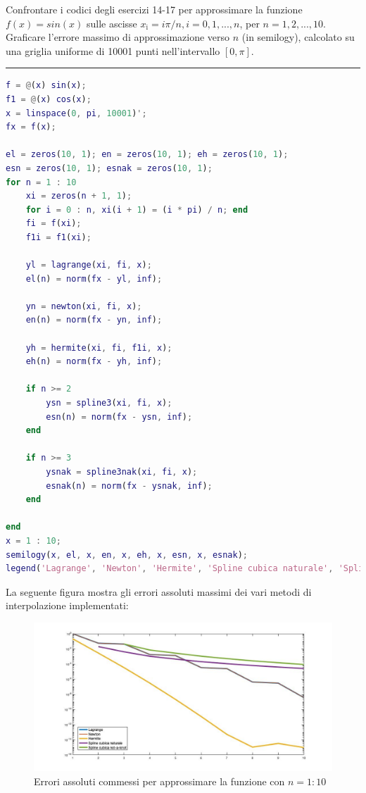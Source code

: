 Confrontare i codici degli esercizi 14-17 per approssimare la funzione $f(x)=sin(x)$ sulle ascisse $x_\mathrm{i}=i\pi/n,i=0,1,...,n$, per $n=1,2,...,10$. 
Graficare l'errore massimo di approssimazione verso $n$ (in semilogy), calcolato su una griglia uniforme di 10001 punti nell'intervallo $[0,\pi]$.

\hspace{1cm}
\par\noindent\rule{\textwidth}{0.4pt}
\hspace{1cm}

\begin{lstlisting}[language=Matlab, caption=Codice Matlab]
f = @(x) sin(x);
f1 = @(x) cos(x);
x = linspace(0, pi, 10001)';
fx = f(x);

el = zeros(10, 1); en = zeros(10, 1); eh = zeros(10, 1); 
esn = zeros(10, 1); esnak = zeros(10, 1); 
for n = 1 : 10
	xi = zeros(n + 1, 1);
	for i = 0 : n, xi(i + 1) = (i * pi) / n; end
	fi = f(xi);
	f1i = f1(xi);
	
	yl = lagrange(xi, fi, x);
	el(n) = norm(fx - yl, inf);
	
	yn = newton(xi, fi, x);
	en(n) = norm(fx - yn, inf);
	
	yh = hermite(xi, fi, f1i, x);
	eh(n) = norm(fx - yh, inf);
	
	if n >= 2
		ysn = spline3(xi, fi, x);
		esn(n) = norm(fx - ysn, inf);
	end
	
	if n >= 3
		ysnak = spline3nak(xi, fi, x);
		esnak(n) = norm(fx - ysnak, inf);
	end
	
end
x = 1 : 10;
semilogy(x, el, x, en, x, eh, x, esn, x, esnak);
legend('Lagrange', 'Newton', 'Hermite', 'Spline cubica naturale', 'Spline cubica not-a-knot');
\end{lstlisting}

La seguente figura mostra gli errori assoluti massimi dei vari metodi di interpolazione implementati:
\begin{figure}[H]
     \includegraphics[width=\textwidth]{Chapter-4/Exercise-18/plot.jpg}
     \caption*{Errori assoluti commessi per approssimare la funzione con $n = 1: 10$}
\end{figure}
